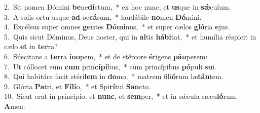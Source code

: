 {2.~}Sit nomen Dómini \textbf{be}ne\textbf{dí}ctum,~* ex hoc nunc, et \textbf{us}que in \textbf{sǽ}culum.\\
{3.~}A solis ortu usque \textbf{ad} oc\textbf{cá}sum,~* laudábile \textbf{no}men \textbf{Dó}mini.\\
{4.~}Excélsus super omnes \textbf{gen}tes \textbf{Dó}\textbf{mi}nus,~* et super cælos \textbf{gló}ria \textbf{e}jus.\\
{5.~}Quis sicut Dóminus, Deus noster, qui in \textbf{al}tis \textbf{há}\textbf{bi}tat,~* et humília réspicit in cælo \textbf{et} in \textbf{ter}ra?\\
{6.~}Súscitans a \textbf{ter}ra \textbf{í}\textbf{no}pem,~* et de stércore \textbf{é}rigens \textbf{páu}perem:\\
{7.~}Ut cóllocet eum \textbf{cum} prin\textbf{cí}\textbf{pi}bus,~* cum princípibus \textbf{pó}puli \textbf{su}i.\\
{8.~}Qui habitáre facit stéri\textbf{lem} in \textbf{do}mo,~* matrem fili\textbf{ó}rum læ\textbf{tán}tem.\\
{9.~}Glória \textbf{Pa}tri, et \textbf{Fí}\textbf{li}o,~* et Spi\textbf{rí}tui \textbf{San}cto.\\
{10.~}Sicut erat in princípio, et \textbf{nunc}, et \textbf{sem}per,~* et in sǽcula sæcu\textbf{ló}rum. \textbf{A}men.\\

